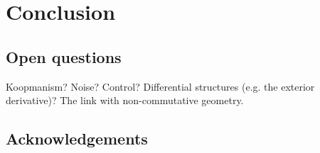 \documentclass[12pt]{amsart}
\begin{document}
\section{Conclusion}

\subsection{Open questions}
Koopmanism?  Noise?  Control?  Differential structures (e.g. the exterior derivative)?  The link with non-commutative geometry.

\subsection{Acknowledgements}



\end{document}
